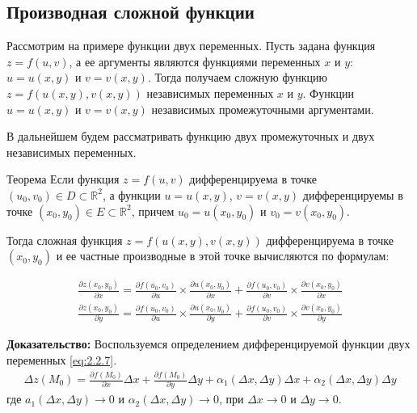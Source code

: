 \subsection{Производная сложной функции} \label{sec:1.5}
Рассмотрим на примере функции двух переменных. Пусть задана функция $z = f(u, v)$, а ее аргументы являются функциями переменных $x$ и $y$: $u=u(x,y)$ и $v=v(x,y)$. Тогда получаем сложную функцию $z = f(u(x,y), v(x,y))$ независимых переменных $x$ и $y$. Функции $u = u(x,y)$ и $v = v(x,y)$ независимых промежуточными аргументами.

В дальнейшем будем рассматривать функцию двух промежуточных и двух независимых переменных.

\begin{tbox*}{Теорема}
	Если функция $z = f(u, v)$ дифференцируема в точке $(u_0, v_0) \in D \subset \mathbb R^2$, а функции $u = u(x,y)$, $v = v(x,y)$ дифференцируемы в точке $(x_0, y_0) \in E \subset \mathbb R^2$, причем $u_0 = u(x_0, y_0)$ и $v_0 = v(x_0, y_0)$.

	Тогда сложная функция $z = f(u(x,y), v(x,y))$ дифференцируема в точке $(x_0, y_0)$ и ее частные производные в этой точке вычисляются по формулам:

	\begin{gather*}
		\frac{\partial z(x_0, y_0)}{\partial x}  = \frac{\partial f(u_0, v_0)}{\partial u} \times \frac{\partial u(x_0, y_0)}{\partial x} + \frac{\partial f(u_0, v_0)}{\partial v} \times \frac{\partial v(x_0, y_0)}{\partial x}\\
		\frac{\partial z(x_0, y_0)}{\partial y} = \frac{\partial f(u_0, v_0)}{\partial u} \times \frac{\partial u(x_0, y_0)}{\partial y} + \frac{\partial f(u_0, v_0)}{\partial v} \times \frac{\partial v(x_0, y_0)}{\partial y}
	\end{gather*}

	\textbf{Доказательство:} Воспользуемся определением дифференцируемой функции двух переменных \cref{eq:2.2.7}.
	\begin{align} \label{eq:2.4.1}
		\Delta z(M_0) = \frac{\partial f(M_0)}{\partial x} \Delta x + \frac{\partial f(M_0)}{\partial y} \Delta y + \alpha_1 (\Delta x, \Delta y) \Delta x + \alpha_2 (\Delta x, \Delta y) \Delta y
	\end{align}
	где $a_1(\Delta x, \Delta y) \to 0$ и $\alpha_2(\Delta x, \Delta y) \to 0$, при $\Delta x \to 0$ и $\Delta y \to 0$. \\


\end{tbox*}
